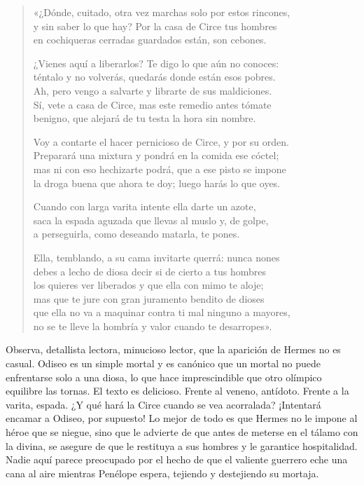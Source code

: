 \begin{verse}
«¿Dónde, cuitado, otra vez marchas solo por estos rincones,\\
y sin saber lo que hay? Por la casa de Circe tus hombres\\
en cochiqueras cerradas guardados están, son cebones.

¿Vienes aquí a liberarlos? Te digo lo que aún no conoces:\\
téntalo y no volverás, quedarás donde están esos pobres.\\
Ah, pero vengo a salvarte y librarte de sus maldiciones.\\
Sí, vete a casa de Circe, mas este remedio antes tómate\\
benigno, que alejará de tu testa la hora sin nombre.

Voy a contarte el hacer pernicioso de Circe, y por su orden.\\
Preparará una mixtura y pondrá en la comida ese cóctel;\\
mas ni con eso hechizarte podrá, que a ese pisto se impone\\
la droga buena que ahora te doy; luego harás lo que oyes.

Cuando con larga varita intente ella darte un azote,\\
saca la espada aguzada que llevas al muslo y, de golpe,\\
a perseguirla, como deseando matarla, te pones.

Ella, temblando, a su cama invitarte querrá: nunca nones\\
debes a lecho de diosa decir si de cierto a tus hombres\\
los quieres ver liberados y que ella con mimo te aloje;\\
mas que te jure con gran juramento bendito de dioses\\
que ella no va a maquinar contra ti mal ninguno a mayores,\\
no se te lleve la hombría y valor cuando te desarropes».
\end{verse}

Observa, detallista lectora, minucioso lector, que la aparición de Hermes no es casual. Odiseo es un simple mortal y es canónico que un mortal no puede enfrentarse solo a una diosa, lo que hace imprescindible que otro olímpico equilibre las tornas. El texto es delicioso. Frente al veneno, antídoto. Frente a la varita, espada. ¿Y qué hará la Circe cuando se vea acorralada? ¡Intentará encamar a Odiseo, por supuesto! Lo mejor de todo es que Hermes no le impone al héroe que se niegue, sino que le advierte de que antes de meterse en el tálamo con la divina, se asegure de que le restituya a sus hombres y le garantice hospitalidad. Nadie aquí parece preocupado por el hecho de que el valiente guerrero eche una cana al aire mientras Penélope espera, tejiendo y destejiendo su mortaja.

